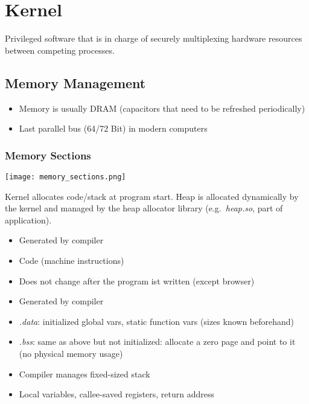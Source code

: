 \section{Kernel}
Privileged software that is in charge of securely multiplexing hardware resources between competing processes.

\subsection{Memory Management}
\begin{itemize}
    \item Memory is usually DRAM (capacitors that need to be refreshed periodically)
    \item Last parallel bus (64/72 Bit) in modern computers
\end{itemize}


\subsubsection{Memory Sections}
\texttt{[image: memory\_sections.png]}

Kernel allocates code/stack at program start. Heap is allocated dynamically by the kernel and managed by the heap allocator library (e.g.\ \textit{heap.so}, part of application).


\begin{itemize}
    \item Generated by compiler
    \item Code (machine instructions)
    \item Does not change after the program ist written (except browser)
\end{itemize}



\begin{itemize}
    \item Generated by compiler
    \item \textit{.data}: initialized global vars, static function vars (sizes known beforehand)
    \item \textit{.bss}: same as above but not initialized: allocate a zero page and point to it (no physical memory usage)
\end{itemize}


\begin{itemize}
    \item Compiler manages fixed-sized stack
    \item Local variables, callee-saved registers, return address
\end{itemize}

